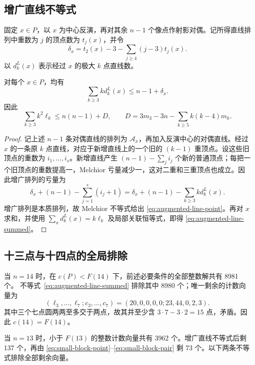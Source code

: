 \subsection{增广直线不等式}

固定 $x\in P$，以 $x$ 为中心反演，再对其余 $n-1$ 个像点作射影对偶。记所得直线排列中重数为 $j$ 的顶点数为 $t_j(x)$，并令
\[
 \delta_x=t_2(x)-3-\sum_{j\ge4}(j-3)t_j(x).
\]
以 $d_k^L(x)$ 表示经过 $x$ 的极大 $k$ 点直线数。

\begin{lemma}\label{lem:augmented-line}
对每个 $x\in P$，均有
\begin{equation}\label{eq:augmented-line-point}
 \sum_{k\ge3}k d_k^L(x)\le n-1+\delta_x.
\end{equation}
因此
\begin{equation}\label{eq:augmented-line-summed}
 \sum_{k\ge3}k^2\ell_k\le n(n-1)+D,
 \qquad
 D=3m_3-3n-\sum_{k\ge5}k(k-4)m_k.
\end{equation}
\end{lemma}

\begin{proof}
记上述 $n-1$ 条对偶直线的排列为 $\mathcal A_x$，再加入反演中心的对偶直线。经过 $x$ 的一条原 $k$ 点直线，对应于新增直线上的一个旧的 $(k-1)$ 重顶点。设这些旧顶点的重数为 $i_1,\ldots,i_s$。新增直线产生
$(n-1)-\sum_j i_j$ 个新的普通顶点；每把一个旧顶点的重数提高一，Melchior 亏量减少一，这对二重和三重顶点也成立。因此增广排列的亏量为
\[
 \delta_x+(n-1)-\sum_{j=1}^s(i_j+1)
 =\delta_x+(n-1)-\sum_{k\ge3}k d_k^L(x).
\]
增广排列是本质排列，故 Melchior 不等式给出
\eqref{eq:augmented-line-point}。再对 $x$ 求和，并使用
$\sum_xd_k^L(x)=k\ell_k$ 及局部关联恒等式，即得
\eqref{eq:augmented-line-summed}。
\end{proof}

\subsection{十三点与十四点的全局排除}

当 $n=14$ 时，在 $c(P)<F(14)$ 下，前述必要条件的全部整数解共有 8981 个。
不等式~\eqref{eq:augmented-line-summed} 排除其中 8980 个；唯一剩余的计数向量为
\[
 (\ell_3,\ldots,\ell_7;c_3,\ldots,c_7)
 =(20,0,0,0,0;23,44,0,2,3).
\]
其中三个七点圆两两至多交于两点，故其并至少含
$3\cdot7-3\cdot2=15$ 点，矛盾。因此 $c(14)=F(14)$。

当 $n=13$ 时，小于 $F(13)$ 的整数计数向量共有 3962 个。增广直线不等式后剩 137 个，再由
\eqref{eq:small-block-point}--\eqref{eq:small-block-pair} 剩 73 个。以下两条不等式排除全部剩余向量。

